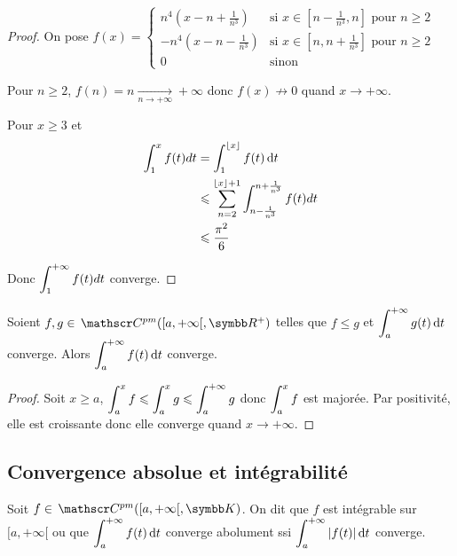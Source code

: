 \begin{proof}
    On pose $f(x) = \begin{cases}
        n^4\left( x - n + \frac 1 {n^3} \right) & \text{si } x \in \left[ n - \frac 1 {n^3}, n \right] \text{ pour } n \geqslant 2 \\
        -n^4\left( x - n - \frac 1 {n^3} \right) & \text{si } x \in \left[ n, n + \frac 1 {n^3} \right] \text{ pour } n \geqslant 2 \\
        0 & \text{sinon}
    \end{cases}$

    Pour $n \geqslant 2$, $f(n) = n \xrightarrow[n \to + \infty   ]{} + \infty$ donc 
    $f(x) \nrightarrow 0$ quand $x \to + \infty$.

    Pour $x \geqslant 3$ et 
    \begin{align}
        \int_1^x f(t) dt &= \int_{1}^{\lfloor x \rfloor} f(t) \,\mathrm{d}t \\
        & \leqslant \sum_{n=2}^{\lfloor x \rfloor + 1} \int_{n - \frac 1 {n^3}}^{n + \frac 1 {n^3}} f(t) dt \\
        & \leqslant \frac{\pi^2}{6}
    \end{align}

    Donc $\displaystyle \int_1^{+ \infty} f(t) dt$ converge.
\end{proof}

\begin{theoreme}{}{}
    Soient $f, g \in \mc{pm}([a, + \infty[, \R^+)$ telles que $f \leqslant g$ et 
    $\displaystyle \int_a^{+ \infty} g(t) \,\mathrm{d}t$ converge. Alors $\displaystyle \int_a^{+ \infty} f(t) \,\mathrm{d}t$ converge.
\end{theoreme}

\begin{proof}
    Soit $x \geqslant a$, $\displaystyle \int_a^x f \leqslant \int_a^x g \leqslant \int_a^{+ \infty} g$ donc
    $\displaystyle \int_a^x f$ est majorée. Par positivité, elle est croissante donc
    elle converge quand $x \to + \infty$.
\end{proof}

\subsection{Convergence absolue et intégrabilité}

\begin{definition}{}{}
    Soit $f \in \mc{pm}([a, + \infty[, \K)$. On dit que $f$ est intégrable sur $[a, + \infty[$
    ou que $\displaystyle \int_a^{+ \infty} f(t) \,\mathrm{d}t$ converge abolument ssi $\displaystyle \int_a^{+ \infty} |f(t)| \,\mathrm{d}t$ converge.
\end{definition}

